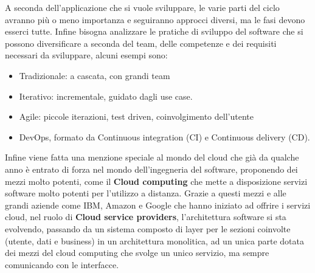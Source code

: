 \documentclass{article}
\begin{document}
A seconda dell'applicazione che si vuole sviluppare, le varie parti del ciclo avranno più o meno importanza e seguiranno approcci diversi, ma le fasi devono esserci tutte.
Infine bisogna analizzare le pratiche di sviluppo del software che si possono diversificare a seconda del team, delle competenze e dei requisiti necessari da sviluppare, alcuni esempi sono:
\begin{itemize}
    \item Tradizionale: a cascata, con grandi team
    \item Iterativo: incrementale, guidato dagli use case.
    \item Agile: piccole iterazioni, test driven, coinvolgimento dell'utente
    \item DevOps, formato da Continuous integration (CI) e Continuous delivery (CD).
\end{itemize}

Infine viene fatta una menzione speciale al mondo del cloud che già da qualche anno è entrato di forza nel mondo dell'ingegneria del software, proponendo dei mezzi molto potenti, come il \textbf{Cloud computing} che mette a disposizione servizi software molto potenti per l'utilizzo a distanza.
Grazie a questi mezzi e alle grandi aziende come IBM, Amazon e Google che hanno iniziato ad offrire i servizi cloud, nel ruolo di \textbf{Cloud service providers}, l'architettura software si sta evolvendo, passando da un  sistema composto di layer per le sezioni coinvolte (utente, dati e business) in un architettura monolitica, ad un unica parte dotata dei mezzi del cloud computing che svolge un unico servizio, ma sempre comunicando con le interfacce.
\end{document}
